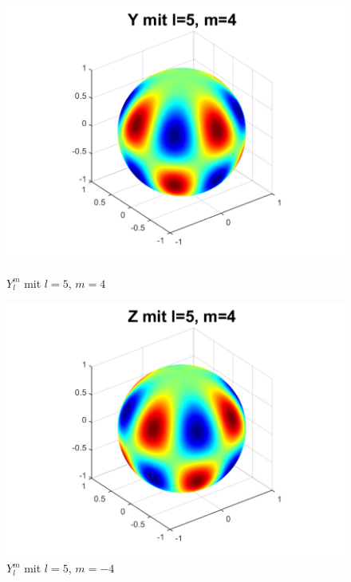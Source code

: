 \begin{figure}
\begin{minipage}[hbt]{0.4\textwidth}
\includegraphics[width=1\textwidth]{chapters/images/ylm/a_5_4.pdf}
\caption{$Y^m_l$ mit $l=5$, $m=4$}
\label{skript:ylm l=5 m=4}
\end{minipage}
\hfill
\begin{minipage}[hbt]{0.4\textwidth}
\centering
\includegraphics[width=1\textwidth]{chapters/images/ylm/b_5_4.pdf}
\caption{$Y^m_l$ mit $l=5$, $m=-4$}
\label{skript:zlm l=5 m=4}
\end{minipage}
\begin{minipage}[hbt]{0.4\textwidth}
\centering

\end{minipage}
\end{figure}
